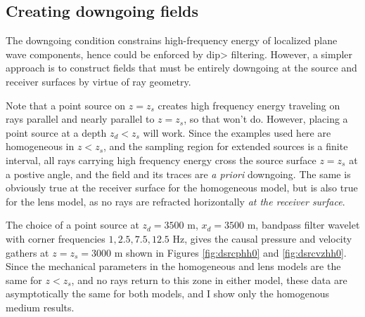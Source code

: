 \documentclass[georeport,12pt]{geophysics}
\begin{document}

\subsection{Creating downgoing fields}
The downgoing condition constrains high-frequency energy of localized
plane wave components, hence could be enforced by dip>
filtering. However, a simpler approach is to construct fields that
must be entirely downgoing at the source and receiver surfaces by
virtue of ray geometry.

Note that a point source
on $z=z_s$ creates high frequency energy traveling on rays parallel
and nearly parallel to $z=z_s$, so that won't do. However, placing a
point source at a depth $z_d<z_s$ will work. Since the examples used here are
homogeneous in $z<z_s$, and the sampling region for extended sources
is a finite interval, all rays carrying high frequency energy cross
the source surface $z=z_s$ at a postive angle, and the field and its
traces are {\em a priori} downgoing. The same is obviously true at the
receiver surface for the homogeneous model, but is also true for the
lens model, as no rays are refracted horizontally {\em at the receiver surface}.

The choice of a point source at
$z_d=3500$ m, $x_d=3500$ m,  bandpass filter wavelet with
corner frequencies $1, 2.5, 7.5, 12.5$ Hz, gives the causal pressure and
velocity gathers at $z=z_s=3000$ m
shown in Figures \ref{fig:dsrcphh0} and \ref{fig:dsrcvzhh0}.  Since the
mechanical parameters in the homogeneous and lens models are the same
for $z<z_s$, and no rays return to this zone in either model, these
data are asymptotically the same for both models, and I show only the
homogenous medium results.


\end{document}
